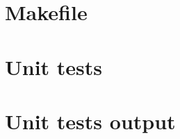 \section{Makefile}

\begin{scriptsize}
\begin{ttfamily}

\end{ttfamily}
\end{scriptsize}

\section{Unit tests}

\begin{scriptsize}
\begin{ttfamily}

\end{ttfamily}
\end{scriptsize}

\section{Unit tests output}

\begin{scriptsize}
\begin{ttfamily}

\end{ttfamily}
\end{scriptsize}


